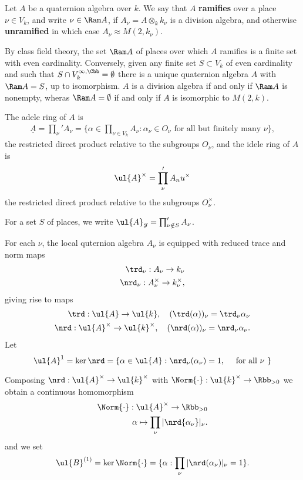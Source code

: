 
Let $A$ be a quaternion algebra over $k$. We say that $A$ \textbf{ramifies} over a place $\nu \in V_k$, and write $\nu \in \Ram A$, if $A_\nu = A \otimes_k k_\nu$ is a division algebra, and otherwise \textbf{unramified} in which case $A_\nu \approx M(2,k_\nu)$.

By class field theory, the set $\Ram A$ of places over which $A$ ramifies is a finite set with even cardinality. Conversely, given any finite set $S \subset V_k$ of even cardinality and such that $S\cap V_k^{\infty,\Cbb}=\emptyset$ there is a unique quaternion algebra $A$ with $\Ram A = S$, up to isomorphism. $A$ is a division algebra if and only if $\Ram A$ is nonempty, wheras $\Ram A = \emptyset$ if and only if $A$ is isomorphic to $M(2,k)$.

The adele ring of $A$ is
\begin{align}
    \underline{A} = \prod_{\nu}' A_\nu = \{\alpha \in \prod_{\nu \in V_k} A_\nu : \alpha_\nu \in O_\nu \text{ for all but finitely many $\nu$} \},
\end{align}
the restricted direct product relative to the subgroups $O_\nu$, and the idele ring of $A$ is
\begin{align}
    \ul{A}^\times  = \prod_{\nu}' A_nu^\times
\end{align}
the restricted direct product relative to the subgroups $O_\nu^\times$.

For a set $S$ of places, we write $\ul{A}_{\not{S}} = \prod_{\nu \notin S}' A_\nu$.

For each $\nu$, the local quternion algebra $A_\nu$ is equipped with reduced trace and norm maps
\begin{align}
    \trd_\nu : A_\nu \to k_\nu \\
    \nrd_\nu : A_\nu^\times \to k_\nu^\times,
\end{align}
giving rise to maps
\begin{align}
    \trd : \ul{A} \to \ul{k}, \quad (\trd(\alpha))_\nu = \trd_\nu \alpha_\nu \\
    \nrd : \ul{A}^\times \to \ul{k}^\times, \quad (\nrd(\alpha))_\nu = \nrd_\nu \alpha_\nu.
\end{align}
Let
\[\ul{A}^1 = \ker \nrd = \{ \alpha \in \ul{A} : \nrd_\nu (\alpha_\nu) =1, \quad \text{ for all $\nu$ }\}\]

Composing $\nrd : \ul{A}^\times \to \ul{k}^\times$ with $\Norm{\cdot}: \ul{k}^\times \to \Rbb_{>0}$ we obtain a continuous homomorphism
\begin{align}
    \Norm{\cdot } : \ul{A}^\times \to \Rbb_{>0} \\
    \alpha \mapsto \prod_{\nu} |\nrd{\alpha_\nu} |_\nu.
\end{align}
and we set
\begin{align}
    \ul{B}^{(1)} = \ker \Norm{\cdot} = \{\alpha : \prod_\nu |\nrd (\alpha_\nu)|_\nu =1\}.
\end{align}

